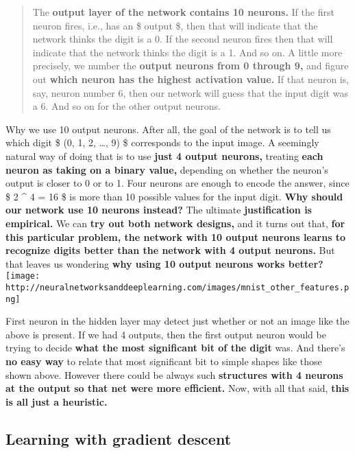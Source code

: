 \documentclass[]{article}
\begin{document}
\begin{quote}
The \textbf{output layer of the network contains 10 neurons.} If the
first neuron fires, i.e., has an \$ output  \$, then that will
indicate that the network thinks the digit is a 0. If the second neuron
fires then that will indicate that the network thinks the digit is a 1.
And so on. A little more precisely, we number the \textbf{output neurons
from 0 through 9,} and figure out \textbf{which neuron has the highest
activation value.} If that neuron is, say, neuron number 6, then our
network will guess that the input digit was a 6. And so on for the other
output neurons.
\end{quote}

Why we use 10 output neurons. After all, the goal of the network is to
tell us which digit \$ (0, 1, 2, \ldots{}, 9) \$ corresponds to the
input image. A seemingly natural way of doing that is to use
\textbf{just 4 output neurons,} treating \textbf{each neuron as taking
on a binary value,} depending on whether the neuron's output is closer
to 0 or to 1. Four neurons are enough to encode the answer, since \$ 2
\^{} 4 = 16 \$ is more than 10 possible values for the input digit.
\textbf{Why should our network use 10 neurons instead? } The ultimate
\textbf{justification is empirical.} We can \textbf{try out both network
designs,} and it turns out that, \textbf{for this particular problem,
the network with 10 output neurons learns to recognize digits better
than the network with 4 output neurons.} But that leaves us wondering
\textbf{why using 10 output neurons works better? }
\texttt{[image: http://neuralnetworksanddeeplearning.com/images/mnist\_other\_features.png]}

First neuron in the hidden layer may detect just whether or not an image
like the above is present. If we had 4 outputs, then the first output
neuron would be trying to decide \textbf{what the most significant bit
of the digit} was. And there's \textbf{no easy way} to relate that most
significant bit to simple shapes like those shown above. However there
could be always such \textbf{structures with 4 neurons at the output so
that net were more efficient.} Now, with all that said, \textbf{this is
all just a heuristic.}

\subsection{Learning with gradient
descent}\label{learning-with-gradient-descent}
\end{document}
